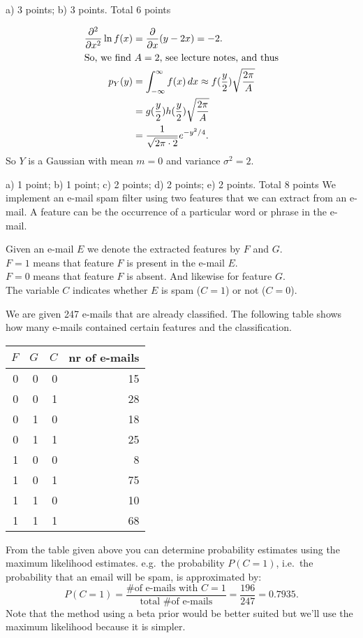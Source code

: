 \documentclass[a4paper]{article}
\begin{document}
\begin{exam}
\begin{vraag}{a) 3 points; b) 3 points. Total 6 points}
\begin{deelvraag}
{\begin{align*}
        	\frac{\partial^2}{\partial x^2} \ln f(x) &= \frac{\partial}{\partial x} (y-2x) = -2. \\
        	\intertext{So, we find $A=2$, see lecture notes, and thus}
        	p_Y(y) &= \int_{-\infty}^{\infty}f(x)\,dx\approx f(\frac{y}{2})\sqrt{\frac{2\pi}{A}} \\
        	       &= g(\frac{y}{2})h(\frac{y}{2})\sqrt{\frac{2\pi}{A}} \\
        	       &= \frac{1}{\sqrt{2\pi\cdot2}}e^{-y^2/4}.
        \end{align*}
        So $Y$ is a Gaussian with mean $m=0$ and variance $\sigma^2=2$.
        }
    \end{deelvraag}
\end{vraag}


\begin{vraag}{a) 1 point; b) 1 point; c) 2 points; d) 2 points; e) 2 points. Total 8 points}
We implement an e-mail spam filter using two features that we can extract from an e-mail.
A feature can be the occurrence of a particular word or phrase in the e-mail.

Given an e-mail $E$ we denote the extracted features by $F$ and $G$.\\
$F=1$ means that feature $F$ is present in the e-mail $E$.\\
$F=0$ means that feature $F$ is absent. And likewise for feature $G$.\\
The variable $C$ indicates whether $E$ is spam ($C=1$) or not ($C=0$).

We are given 247 e-mails that are already classified. The following table shows how many e-mails contained certain features and the classification.
\begin{center}
  \begin{tabular}{rrr|r}
  $F$ & $G$ & $C$ & nr of e-mails \\
  \hline
  0 & 0 & 0 & 15 \\
  0 & 0 & 1 & 28 \\
  0 & 1 & 0 & 18 \\
  0 & 1 & 1 & 25 \\
  1 & 0 & 0 &  8 \\
  1 & 0 & 1 & 75 \\
  1 & 1 & 0 & 10 \\
  1 & 1 & 1 & 68
  \end{tabular}
\end{center}
\begin{deelvraag}
From the table given above you can determine probability estimates using the maximum likelihood estimates. e.g.\ the probability $P(C=1)$, i.e.\ the probability that an email will be spam, is approximated by:
\[ P(C=1) = \frac{\text{\# of e-mails with }C=1}{\text{total \# of e-mails}} =
   \frac{196}{247}=0.7935.
\]
Note that the method using a beta prior would be better suited but we'll use the maximum likelihood
because it is simpler.


\end{deelvraag}
\end{vraag}
\end{exam}
\end{document}
